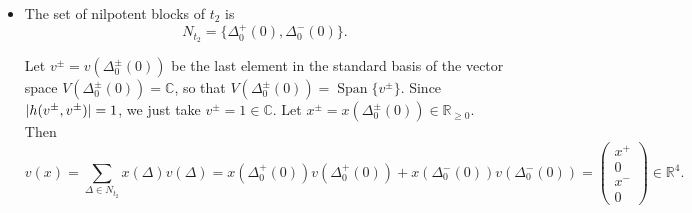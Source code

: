 \documentclass{article}
\theoremstyle{definition}
\newcommand{\R}{\mathbb{R}}
\newcommand{\C}{\mathbb{C}}
\DeclarePairedDelimiter{\abs}{\lvert}{\rvert}
\newcommand{\Span}[1]{\operatorname{Span}\{#1\}}
\begin{document}
\begin{itemize}
    Therefore the matrices $D_2$ and $D_3$ are as follows: \begin{equation}\label{8d_iso_neutral_t1_D23}
    D_2(t_1,x)=\left(\begin{smallmatrix}
        0 & 0 & 0 & 0 & 0 & x & 0 \\
        0 & 0 & 0 & 0 & -x & 0 & 0 \\
        0 & 0 & 0 & 0 & 1 & 0 & 0 \\
        0 & 0 & 0 & 0 & 0 & 1 & 0 \\
        0 & 0 & 0 & 0 & 0 & 0 & x \\
        0 & 0 & 0 & 0 & 0 & 0 & 0 \\
        0 & 0 & 0 & 0 & 0 & 0 & 0
    \end{smallmatrix}\right),\quad D_3(t_1,x)=\left(\begin{smallmatrix}
        0 & 0 & 0 & 0 & 0 & x & 0 \\
        0 & 0 & 0 & 0 & -x & 0 & 1 \\
        0 & 0 & 0 & 0 & 1 & 0 & 0 \\
        0 & 0 & 0 & 0 & 0 & 1 & 0 \\
        0 & 0 & 0 & 0 & 0 & 0 & x \\
        0 & 0 & 0 & 0 & 0 & 0 & 0 \\
        0 & 0 & 0 & 0 & 0 & 0 & 0
    \end{smallmatrix}\right).\end{equation}
    \item The set of nilpotent blocks of $t_2$ is $$N_{t_2}=\{\Delta_0^+(0),\Delta_0^-(0)\}.$$

    Let $v^\pm=v(\Delta_0^\pm(0))$ be the last element in the standard basis of the vector space $V(\Delta_0^\pm(0))=\C$, so that $V(\Delta_0^\pm(0))=\Span{v^\pm}$. Since $\abs{h(v^\pm,v^\pm)}=1$, we just take $v^\pm=1\in\C$. Let $x^\pm=x(\Delta_0^\pm(0))\in\R_{\geq0}$. Then $$v(x)=\sum_{\Delta\in N_{t_2}}x(\Delta)v(\Delta)=x(\Delta_0^+(0))v(\Delta_0^+(0))+x(\Delta_0^-(0))v(\Delta_0^-(0))=\begin{pmatrix}
        x^+\\0\\x^-\\0
    \end{pmatrix}\in\R^4.$$


\end{itemize}
\end{document}
